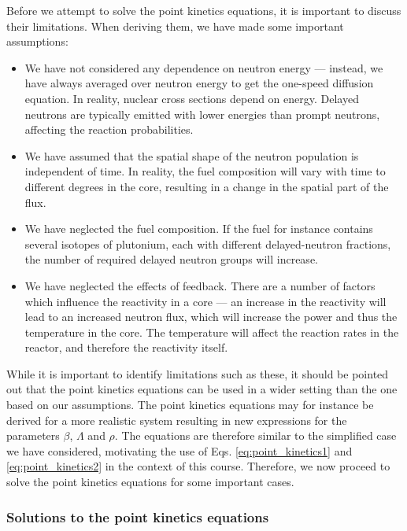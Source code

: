 Before we attempt to solve the point kinetics equations, it is important to discuss their limitations. When deriving them, we have made some important assumptions:
\begin{itemize}
	\item We have not considered any dependence on neutron energy --- instead, we have always averaged over neutron energy to get the one-speed diffusion equation. In reality, nuclear cross sections depend on energy. Delayed neutrons are typically emitted with lower energies than prompt neutrons, affecting the reaction probabilities.
	\item We have assumed that the spatial shape of the neutron population is independent of time. In reality, the fuel composition will vary with time to different degrees in the core, resulting in a change in the spatial part of the flux.
	\item We have neglected the fuel composition. If the fuel for instance contains several isotopes of plutonium, each with different delayed-neutron fractions, the number of required delayed neutron groups will increase.
	\item We have neglected the effects of feedback. There are a number of factors which influence the reactivity in a core --- an increase in the reactivity will lead to an increased neutron flux, which will increase the power and thus the temperature in the core. The temperature will affect the reaction rates in the reactor, and therefore the reactivity itself.
\end{itemize}
While it is important to identify limitations such as these, it should be pointed out that the point kinetics equations can be used in a wider setting than the one based on our assumptions. The point kinetics equations may for instance be derived for a more realistic system resulting in new expressions for the parameters $\beta$, $\Lambda$ and $\rho$. The equations are therefore similar to the simplified case we have considered, motivating the use of Eqs. \ref{eq:point_kinetics1} and \ref{eq:point_kinetics2} in the context of this course. Therefore, we now proceed to solve the point kinetics equations for some important cases.

\subsubsection{Solutions to the point kinetics equations}
